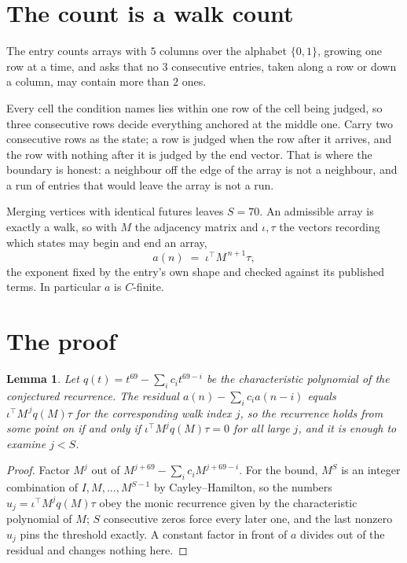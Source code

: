 \documentclass[11pt,a4paper]{article}
\theoremstyle{plain}
\newtheorem{lemma}[theorem]{Lemma}
\theoremstyle{definition}
\begin{document}
\section{The count is a walk count}

The entry counts arrays with $5$ columns over the alphabet $\{0,1\}$, growing one row at a time, and asks that no $3$ consecutive entries, taken along a row or down a column, may contain more than $2$ ones.

Every cell the condition names lies within one row of the cell being judged, so three consecutive rows decide everything anchored at the middle one. Carry two consecutive rows as the state; a row is judged when the row after it arrives, and the row with nothing after it is judged by the end vector. That is where the boundary is honest: a neighbour off the edge of the array is not a neighbour, and a run of entries that would leave the array is not a run.

Merging vertices with identical futures leaves $S=70$. An admissible array is exactly a walk, so with $M$ the adjacency matrix and $\iota,\tau$ the vectors recording which states may begin and end an array,
\[
a(n)\;=\;\iota^{\!\top}M^{\,n+1}\tau ,
\]
the exponent fixed by the entry's own shape and checked against its published terms. In
particular $a$ is $C$-finite.

\section{The proof}

\begin{lemma}\label{lem:crit}
Let $q(t)=t^{69}-\sum_i c_it^{69-i}$ be the characteristic polynomial of the
conjectured recurrence. The residual $a(n)-\sum_ic_ia(n-i)$ equals
$\iota^{\!\top}M^{\,j}q(M)\tau$ for the corresponding walk index $j$, so the recurrence
holds from some point on if and only if $\iota^{\!\top}M^{j}q(M)\tau=0$ for all large $j$,
and it is enough to examine $j<S$.
\end{lemma}

\begin{proof}
Factor $M^{j}$ out of $M^{j+69}-\sum_ic_iM^{j+69-i}$. For the bound, $M^{S}$
is an integer combination of $I,M,\dots,M^{S-1}$ by Cayley--Hamilton, so the numbers
$u_j=\iota^{\!\top}M^{j}q(M)\tau$ obey the monic recurrence given by the characteristic
polynomial of $M$; $S$ consecutive zeros force every later one, and the last nonzero $u_j$
pins the threshold exactly. A constant factor in front of $a$ divides out of the residual and
changes nothing here.
\end{proof}
\end{document}
